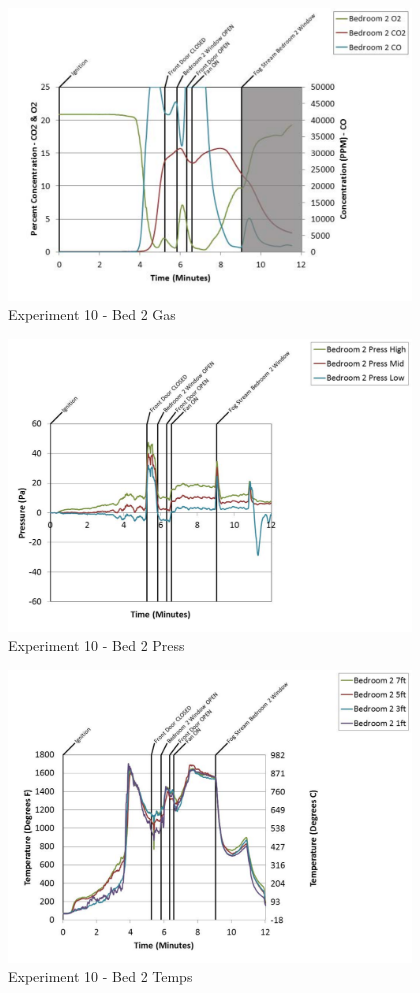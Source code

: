 \documentclass{article}
\begin{document}
\begin{appendices}
	\clearpage

	\begin{figure}[h!]
		\centering
		\includegraphics[height=3.05in]{0_Images/Results_Charts/Exp_10_Charts/Bed2Gas.pdf}
		\caption{Experiment 10 - Bed 2 Gas}
	\end{figure}
 

	\begin{figure}[h!]
		\centering
		\includegraphics[height=3.05in]{0_Images/Results_Charts/Exp_10_Charts/Bed2Press.pdf}
		\caption{Experiment 10 - Bed 2 Press}
	\end{figure}
 
	\clearpage

	\begin{figure}[h!]
		\centering
		\includegraphics[height=3.05in]{0_Images/Results_Charts/Exp_10_Charts/Bed2Temps.pdf}
		\caption{Experiment 10 - Bed 2 Temps}
	\end{figure}
 


\end{appendices}
\end{document}
